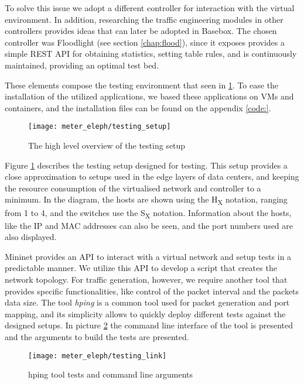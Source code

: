 \par To solve this issue we adopt a different controller for interaction with the virtual environment. In addition, researching the traffic engineering modules in
other controllers provides ideas that can later be adopted in Basebox. The chosen controller was Floodlight (see section \ref{chap:flood}), since it exposes
provides a simple REST API for obtaining statistics, setting table rules, and is continuously maintained, providing an optimal test bed.

\par These elements compose the testing environment that seen in \ref{fig:test_setup}. To ease the installation of the utilized applications, 
we based these applications on VMs and containers, and the installation files can be found on the appendix \ref{code:}.

\begin{figure} 
    \centering
    \texttt{[image: meter\_eleph/testing\_setup]}
    \caption {The high level overview of the testing setup}
    \label{fig:test_setup}
\end{figure} 

\par Figure \ref{fig:test_setup} describes the testing setup designed for testing. This setup provides a close approximation to setups used
in the edge layers of data centers, and keeping the resource consumption of the virtualised network and controller to a minimum. In the diagram, the hosts are shown
using the H\textsubscript{X} notation, ranging from 1 to 4, and the switches use the S\textsubscript{X} notation. Information about the hosts, like the IP and MAC
addresses can also be seen, and the port numbers used are also displayed.

Mininet provides an API to interact with a virtual network and setup tests in a predictable manner. We utilize this API to develop a script that creates the network
topology. For traffic generation, however, we require another tool that provides specific functionalities, like control of the packet interval and the packets data
size. The tool \textit{hping} is a common tool used for packet generation and port mapping, and its simplicity allows to quickly deploy different tests against the
designed setups. In picture \ref{fig:hping_setup} the command line interface of the tool is presented and the arguments to build the tests are presented.

\begin{figure}[H]
    \centering
    \texttt{[image: meter\_eleph/testing\_link]}
    \caption{hping tool tests and command line arguments}
    \label{fig:hping_setup}
\end{figure}

